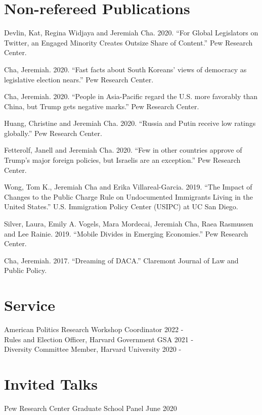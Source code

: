 \documentclass[margin, line]{res}
\begin{document}
\begin{resume}
\section{Non-refereed Publications}
\begin{etaremune}
	\item Devlin, Kat, Regina Widjaya and Jeremiah Cha. 2020. ``For Global Legislators on Twitter, an Engaged Minority Creates Outsize Share of Content.'' Pew Research Center.
	\item Cha, Jeremiah. 2020. ``Fast facts about South Koreans’ views of democracy as legislative election nears.'' Pew Research Center.
	\item Cha, Jeremiah. 2020. ``People in Asia-Pacific regard the U.S. more favorably than China, but Trump gets negative marks.'' Pew Research Center.
	\item Huang, Christine and Jeremiah Cha. 2020. ``Russia and Putin receive low ratings globally.'' Pew Research Center.
	\item Fetterolf, Janell and Jeremiah Cha. 2020. ``Few in other countries approve of Trump’s major foreign policies, but Israelis are an exception.'' Pew Research Center.
	\item Wong, Tom K., Jeremiah Cha and Erika Villareal-Garcia. 2019. ``The Impact of Changes to the Public Charge Rule on Undocumented Immigrants Living in the United States.'' U.S. Immigration Policy Center (USIPC) at UC San Diego.
	\item Silver, Laura, Emily A. Vogels, Mara Mordecai, Jeremiah Cha, Raea Rasmussen and Lee Rainie. 2019. ``Mobile Divides in Emerging Economies.'' Pew Research Center.
	\item Cha, Jeremiah. 2017. ``Dreaming of DACA.'' Claremont Journal of Law and Public Policy.
\end{etaremune}

\section{Service}
American Politics Research Workshop Coordinator \hfill 2022 - \\
Rules and Election Officer, Harvard Government GSA \hfill 2021 -\\
Diversity Committee Member, Harvard University \hfill 2020 -

\section{Invited Talks}
Pew Research Center Graduate School Panel \hfill June 2020


\end{resume}
\end{document}
